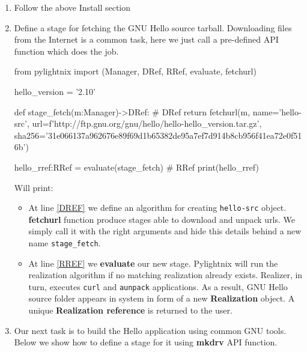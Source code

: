 \documentclass{article}
\begin{document}
\begin{enumerate}

  \item Follow the above Install section

  \item Define a stage for fetching the GNU Hello source tarball. Downloading
    files from the Internet is a common task, here we just call a pre-defined
    API function which does the job.

    \begin{pythontexcode}
    from pylightnix import (Manager, DRef, RRef, evaluate, fetchurl)

    hello_version = '2.10'

    def stage_fetch(m:Manager)->DRef: # DRef \label{DREF}
      return fetchurl(m,
        name='hello-src',
        url=f'http://ftp.gnu.org/gnu/hello/hello-{hello_version}.tar.gz',
        sha256='31e066137a962676e89f69d1b65382de95a7ef7d914b8cb956f41ea72e0f516b')

    hello_rref:RRef = evaluate(stage_fetch)  # RRef \label{RREF}
    print(hello_rref)
    \end{pythontexcode}

    Will print:
    \par

    \mystdout

    \par

    \begin{itemize}

      \item At line \ref{DREF} we define an algorithm for creating
        \texttt{hello-src} object. \textbf{fetchurl} function produce stages
        able to download and unpack urls. We simply call it with
        the right arguments and hide this details behind a new name
        \texttt{stage\_fetch}.

      \item At line \ref{RREF} we \textbf{evaluate} our new stage. Pylightnix
        will run the realization algorithm if no matching realization already
        exists. Realizer, in turn, executes \texttt{curl} and \texttt{aunpack}
        applications. As a result, GNU Hello source folder appears in system in
        form of a new \textbf{Realization} object. A unique \textbf{Realization
        reference} is returned to the user.

    \end{itemize}

  \item Our next task is to build the Hello application using common GNU tools.
    Below we show how to define a stage for it using \textbf{mkdrv} API
    function.


\end{enumerate}
\end{document}
